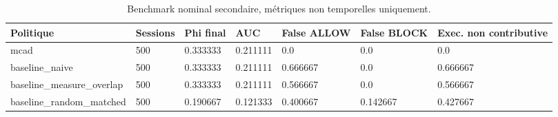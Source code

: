 \begin{table}[t]
\centering
\caption{Benchmark nominal secondaire, métriques non temporelles uniquement.}
\label{tab:v3-secondary-policy}
\small
\begin{tabular}{p{}p{}p{}p{}p{}p{}p{}}
\hline
Politique & Sessions & Phi final & AUC & False ALLOW & False BLOCK & Exec. non contributive \\
\hline
mcad & 500 & 0.333333 & 0.211111 & 0.0 & 0.0 & 0.0 \\
baseline\_naive & 500 & 0.333333 & 0.211111 & 0.666667 & 0.0 & 0.666667 \\
baseline\_measure\_overlap & 500 & 0.333333 & 0.211111 & 0.566667 & 0.0 & 0.566667 \\
baseline\_random\_matched & 500 & 0.190667 & 0.121333 & 0.400667 & 0.142667 & 0.427667 \\
\hline
\end{tabular}
\end{table}
